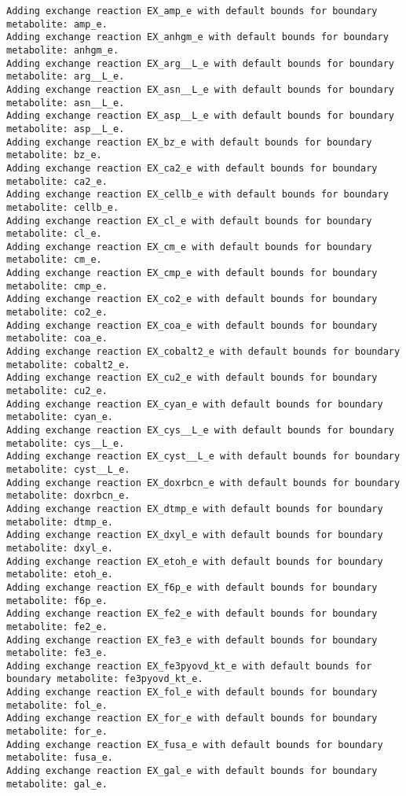 \documentclass[
  letterpaper,
  DIV=11,
  numbers=noendperiod]{scrartcl}
\begin{document}
\begin{verbatim}
Adding exchange reaction EX_amp_e with default bounds for boundary metabolite: amp_e.
Adding exchange reaction EX_anhgm_e with default bounds for boundary metabolite: anhgm_e.
Adding exchange reaction EX_arg__L_e with default bounds for boundary metabolite: arg__L_e.
Adding exchange reaction EX_asn__L_e with default bounds for boundary metabolite: asn__L_e.
Adding exchange reaction EX_asp__L_e with default bounds for boundary metabolite: asp__L_e.
Adding exchange reaction EX_bz_e with default bounds for boundary metabolite: bz_e.
Adding exchange reaction EX_ca2_e with default bounds for boundary metabolite: ca2_e.
Adding exchange reaction EX_cellb_e with default bounds for boundary metabolite: cellb_e.
Adding exchange reaction EX_cl_e with default bounds for boundary metabolite: cl_e.
Adding exchange reaction EX_cm_e with default bounds for boundary metabolite: cm_e.
Adding exchange reaction EX_cmp_e with default bounds for boundary metabolite: cmp_e.
Adding exchange reaction EX_co2_e with default bounds for boundary metabolite: co2_e.
Adding exchange reaction EX_coa_e with default bounds for boundary metabolite: coa_e.
Adding exchange reaction EX_cobalt2_e with default bounds for boundary metabolite: cobalt2_e.
Adding exchange reaction EX_cu2_e with default bounds for boundary metabolite: cu2_e.
Adding exchange reaction EX_cyan_e with default bounds for boundary metabolite: cyan_e.
Adding exchange reaction EX_cys__L_e with default bounds for boundary metabolite: cys__L_e.
Adding exchange reaction EX_cyst__L_e with default bounds for boundary metabolite: cyst__L_e.
Adding exchange reaction EX_doxrbcn_e with default bounds for boundary metabolite: doxrbcn_e.
Adding exchange reaction EX_dtmp_e with default bounds for boundary metabolite: dtmp_e.
Adding exchange reaction EX_dxyl_e with default bounds for boundary metabolite: dxyl_e.
Adding exchange reaction EX_etoh_e with default bounds for boundary metabolite: etoh_e.
Adding exchange reaction EX_f6p_e with default bounds for boundary metabolite: f6p_e.
Adding exchange reaction EX_fe2_e with default bounds for boundary metabolite: fe2_e.
Adding exchange reaction EX_fe3_e with default bounds for boundary metabolite: fe3_e.
Adding exchange reaction EX_fe3pyovd_kt_e with default bounds for boundary metabolite: fe3pyovd_kt_e.
Adding exchange reaction EX_fol_e with default bounds for boundary metabolite: fol_e.
Adding exchange reaction EX_for_e with default bounds for boundary metabolite: for_e.
Adding exchange reaction EX_fusa_e with default bounds for boundary metabolite: fusa_e.
Adding exchange reaction EX_gal_e with default bounds for boundary metabolite: gal_e.

\end{verbatim}
\end{document}
